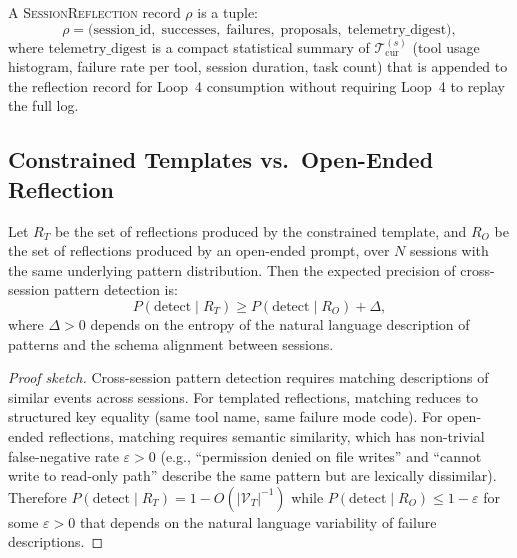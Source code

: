 \vspace{0.5em}

\begin{definition}
\label{def:session_reflection}
A \textsc{SessionReflection} record $\rho$ is a tuple:
\begin{equation}
\rho = \bigl( \text{session\_id},\; \text{successes},\; \text{failures},\;
              \text{proposals},\; \text{telemetry\_digest} \bigr),
\end{equation}
where $\text{telemetry\_digest}$ is a compact statistical summary of
$\mathcal{T}^{(s)}_{\text{cur}}$ (tool usage histogram, failure rate per tool,
session duration, task count) that is appended to the reflection record for
Loop~4 consumption without requiring Loop~4 to replay the full log.
\end{definition}

\subsection{Constrained Templates vs.\ Open-Ended Reflection}

\begin{theorem}
\label{thm:template_aggregation}
Let $R_T$ be the set of reflections produced by the constrained template, and
$R_O$ be the set of reflections produced by an open-ended prompt, over $N$
sessions with the same underlying pattern distribution. Then the expected
precision of cross-session pattern detection is:
\begin{equation}
P(\text{detect} \mid R_T) \geq P(\text{detect} \mid R_O) + \Delta,
\end{equation}
where $\Delta > 0$ depends on the entropy of the natural language description
of patterns and the schema alignment between sessions.
\end{theorem}

\begin{proof}[Proof sketch]
Cross-session pattern detection requires matching descriptions of similar events
across sessions. For templated reflections, matching reduces to structured key
equality (same tool name, same failure mode code). For open-ended reflections,
matching requires semantic similarity, which has non-trivial false-negative
rate $\varepsilon > 0$ (e.g., ``permission denied on file writes'' and
``cannot write to read-only path'' describe the same pattern but are
lexically dissimilar). Therefore $P(\text{detect} \mid R_T) = 1 - O(|\mathcal{V}_T|^{-1})$
while $P(\text{detect} \mid R_O) \leq 1 - \varepsilon$ for some $\varepsilon > 0$
that depends on the natural language variability of failure descriptions.
\end{proof}

